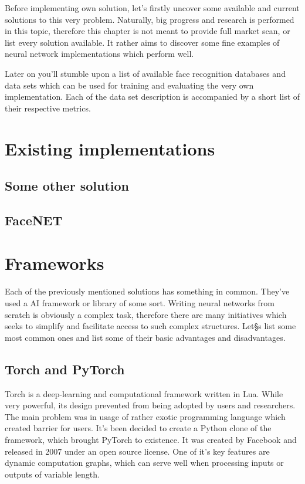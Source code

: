Before implementing own solution, let's firstly uncover some available and current solutions to this very problem. Naturally, big progress and research is performed in this topic, therefore this chapter is not meant to provide full market scan, or list every solution available. It rather aims to discover some fine examples of neural network implementations which perform well.

Later on you'll stumble upon a list of available face recognition databases and data sets which can be used for training and evaluating the very own implementation. Each of the data set description is accompanied by a short list of their respective metrics.

\section{Existing implementations}

\subsection{Some other solution}

\subsection{FaceNET}

\section{Frameworks}

Each of the previously mentioned solutions has something in common. They've used a AI framework or library of some sort. Writing neural networks from scratch is obviously a complex task, therefore there are many initiatives which seeks to simplify and facilitate access to such complex structures. Let§s list some most common ones and list some of their basic advantages and disadvantages.

\subsection{Torch and PyTorch}

Torch is a deep-learning and computational framework written in Lua. While very powerful, its design prevented from being adopted by users and researchers. The main problem was in usage of rather exotic programming language which created barrier for users. It's been decided to create a Python clone of the framework, which brought PyTorch to existence. It was created by Facebook and released in 2007 under an open source license. One of it's key features are dynamic computation graphs, which can serve well when processing inputs or outputs of variable length.

